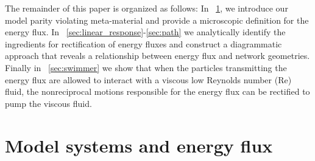 \documentclass[
 preprint,
 preprintnumbers,
 amsmath,amssymb,
 aps,
 pre,
 longbibliography,
 superscriptaddress,
 10pt, twocolumn
]{revtex4-1}
\begin{document}





The remainder of this paper is organized as follows:
In \secname~\ref{sec:model}, we introduce our model parity violating meta-material and provide a microscopic definition for the energy flux.
In \secname~\ref{sec:linear_response}-\ref{sec:path} we analytically identify the ingredients for rectification of energy fluxes and construct a diagrammatic approach that reveals a relationship between energy flux and network geometries.
Finally in \secname~\ref{sec:swimmer} we show that when the particles transmitting the energy flux are allowed to interact with a viscous low Reynolds number (Re) fluid, the nonreciprocal motions responsible for the energy flux can be rectified to pump the viscous fluid. 

\section{Model systems and energy flux} \label{sec:model}
\end{document}

